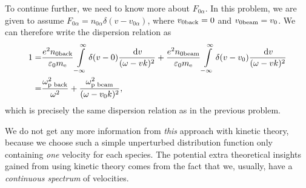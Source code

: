\documentclass[11pt,a4paper, 
swedish, english %
]{article}
\newcommand{\enull}{\ensuremath{\varepsilon_{0}}}
\newcommand{\mee}{\ensuremath{m_{\text{e}}}}
\begin{document}
To continue further, we need to know more about $F_{0\alpha}$. In this
problem, we are given to assume
$F_{0\alpha}=n_{0\alpha}\delta(v-v_{0\alpha})$, where $v_{0\text{back}}=0$
and $v_{0\text{beam}}=v_0$. We can therefore write the dispersion relation
as
\begin{equation}
\begin{aligned}
1=&\frac{e^2\back{n}{0}}{\enull\mee} 
\int_{-\infty}^{\infty}\delta(v-0)
\frac{\id{v}}{(\omega-vk)^2}
+\frac{e^2\beam{n}{0}}{\enull\mee} 
\int_{-\infty}^{\infty}\delta(v-v_0)
\frac{\id{v}}{(\omega-vk)^2}\\
=&\frac{\back{\omega}{\text{p }}^2}{\omega^2}
+\frac{\beam{\omega}{\text{p }}^2}{(\omega-v_0k)^2},
\end{aligned}
\end{equation}
which is precisely the same dispersion relation as in the previous
problem.

We do not get any more information from \emph{this} approach with
kinetic theory, because we choose such a simple unperturbed
distribution function only containing \emph{one} velocity for each
species. The potential extra theoretical insights gained from using
kinetic theory comes from the fact that we, usually, have a
\emph{continuous spectrum} of velocities. 




\end{document}
